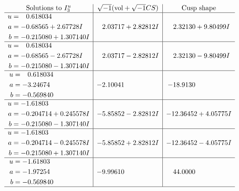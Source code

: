 \documentclass[1p]{elsarticle_modified}
\theoremstyle{definition}
\newcommand{\I}{\sqrt{-1}}
\begin{document}
$$\begin{array}{c|c|c}  
\text{Solutions to }I^u_{3}& \I (\text{vol} + \sqrt{-1}CS) & \text{Cusp shape}\\
 \hline 
\begin{aligned}
u &= \phantom{-}0.618034\phantom{ +0.000000I} \\
a &= -0.68565 + 2.67728 I \\
b &= -0.215080 + 1.307140 I\end{aligned}
 & \phantom{-}2.03717 + 2.82812 I & \phantom{-}2.32130 + 9.80499 I \\ \hline\begin{aligned}
u &= \phantom{-}0.618034\phantom{ +0.000000I} \\
a &= -0.68565 - 2.67728 I \\
b &= -0.215080 - 1.307140 I\end{aligned}
 & \phantom{-}2.03717 - 2.82812 I & \phantom{-}2.32130 - 9.80499 I \\ \hline\begin{aligned}
u &= \phantom{-}0.618034\phantom{ +0.000000I} \\
a &= -3.24674\phantom{ +0.000000I} \\
b &= -0.569840\phantom{ +0.000000I}\end{aligned}
 & -2.10041\phantom{ +0.000000I} & -18.9130\phantom{ +0.000000I} \\ \hline\begin{aligned}
u &= -1.61803\phantom{ +0.000000I} \\
a &= -0.204714 + 0.245578 I \\
b &= -0.215080 - 1.307140 I\end{aligned}
 & -5.85852 - 2.82812 I & -12.36452 + 4.05775 I \\ \hline\begin{aligned}
u &= -1.61803\phantom{ +0.000000I} \\
a &= -0.204714 - 0.245578 I \\
b &= -0.215080 + 1.307140 I\end{aligned}
 & -5.85852 + 2.82812 I & -12.36452 - 4.05775 I \\ \hline\begin{aligned}
u &= -1.61803\phantom{ +0.000000I} \\
a &= -1.97254\phantom{ +0.000000I} \\
b &= -0.569840\phantom{ +0.000000I}\end{aligned}
 & -9.99610\phantom{ +0.000000I} & \phantom{-}44.0000\phantom{ +0.000000I}\\
 \hline 
 \end{array}$$\newpage\newpage\renewcommand{\arraystretch}{1}
\end{document}
